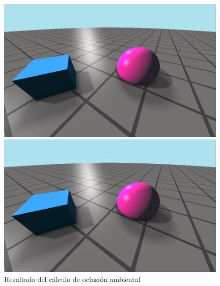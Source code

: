 \begin{figure}[!h]
     \begin{minipage}[c]{0.49\linewidth}
        \centering
        \includegraphics[width=0.98\textwidth]{Plantilla-TFG-master/img/ao2.png}
        \caption{$M=2$}
     \end{minipage}
     \begin{minipage}[c]{0.49\linewidth}
        \centering
        \includegraphics[width=0.98\textwidth]{Plantilla-TFG-master/img/ao4.png}
        \caption{$M=4$}
     \end{minipage}
     \caption{Resultado del cálculo de oclusión ambiental}
     \label{fig:resAO}
\end{figure}
